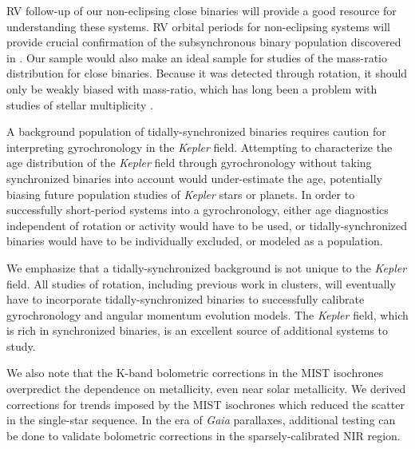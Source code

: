 \documentclass[manuscript]{aastex6}
\newcommand{\Kepler}{\mbox{\textit{Kepler}}}
\newcommand{\Gaia}{\mbox{\textit{Gaia}}}
\begin{document}
RV follow-up of our non-eclipsing close binaries will provide a good resource
for understanding these systems. RV orbital periods for non-eclipsing systems 
will provide crucial confirmation of the subsynchronous binary population 
discovered in \citet{Lurie17}. Our sample would also make an ideal sample for
studies of the mass-ratio distribution for close binaries. Because it was
detected through rotation, it should only be weakly biased with mass-ratio,
which has long been a problem with studies of stellar multiplicity
\citep{Halbwachs03}.

A background population of tidally-synchronized binaries requires caution for
interpreting gyrochronology in the \Kepler{} field. Attempting to characterize
the age distribution of the \Kepler{} field through gyrochronology without 
taking synchronized binaries into account would under-estimate the age, 
potentially biasing future population studies of \Kepler{} stars or planets. 
In order to successfully short-period systems into a gyrochronology, either age 
diagnostics independent of rotation or activity would have to be used, or
tidally-synchronized binaries would have to be individually excluded, or
modeled as a population.

We emphasize that a tidally-synchronized background is not unique to the
\Kepler{} field. All studies of rotation, including previous work in clusters,
will eventually have to incorporate tidally-synchronized binaries to
successfully calibrate gyrochronology and angular momentum evolution models.
The \Kepler{} field, which is rich in synchronized binaries, is an excellent 
source of additional systems to study.

We also note that the K-band bolometric corrections in the MIST isochrones
overpredict the dependence on metallicity, even near solar metallicity. We
derived corrections for trends imposed by the MIST isochrones which reduced the
scatter in the single-star sequence. In the era of \Gaia{} parallaxes,
additional testing can be done to validate bolometric corrections in the
sparsely-calibrated NIR region.

\acknowledgments
\end{document}
